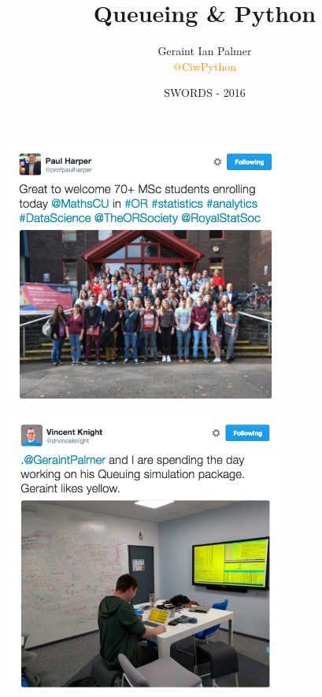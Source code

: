 \documentclass{beamer}
\title
{Queueing \& Python}
\author{Geraint Ian Palmer\\\textcolor{darkorange}{@CiwPython}}
\date{SWORDS - 2016}
\begin{document}
\frame{\titlepage}


\begin{frame}
  \begin{center}
  \href{https://twitter.com/profpaulharper/status/778218607641817088}{\includegraphics[width=0.7\textwidth]{tweets/masters}}
  \end{center}
\end{frame}

\begin{frame}
  \begin{center}
  \href{https://twitter.com/drvinceknight/status/722074454566768640}{\includegraphics[width=0.7\textwidth]{tweets/sprinting_1}}
  \end{center}
\end{frame}
\end{document}
